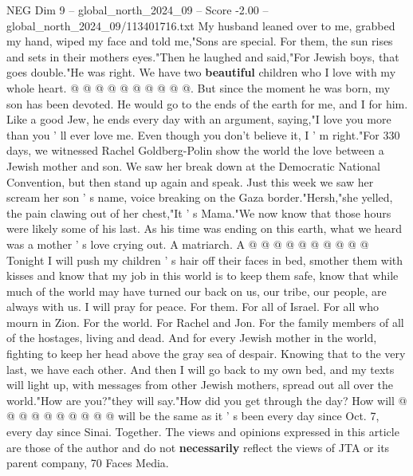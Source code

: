 \begin{textsample}{NEG Dim 9 – global\_north\_2024\_09 – Score -2.00 – global\_north\_2024\_09/113401716.txt}
My husband leaned over to me, grabbed my hand, wiped my face and told me,"Sons are special.
For them, the sun rises and sets in their mothers eyes."Then he laughed and said,"For Jewish boys, that goes double."He was right.
We have two \textbf{beautiful} children who I love with my whole heart. @ @ @ @ @ @ @ @ @ @.
But since the moment he was born, my son has been devoted.
He would go to the ends of the earth for me, and I for him.
Like a good Jew, he ends every day with an argument, saying,"I love you more than you ' ll ever love me.
Even though you don't believe it, I ' m right."For 330 days, we witnessed Rachel Goldberg-Polin show the world the love between a Jewish mother and son.
We saw her break down at the Democratic National Convention, but then stand up again and speak.
Just this week we saw her scream her son ' s name, voice breaking on the Gaza border."Hersh,"she yelled, the pain clawing out of her chest,"It ' s Mama."We now know that those hours were likely some of his last.
As his time was ending on this earth, what we heard was a mother ' s love crying out.
A matriarch.
A @ @ @ @ @ @ @ @ @ @ Tonight I will push my children ' s hair off their faces in bed, smother them with kisses and know that my job in this world is to keep them safe, know that while much of the world may have turned our back on us, our tribe, our people, are always with us.
I will pray for peace.
For them.
For all of Israel.
For all who mourn in Zion.
For the world.
For Rachel and Jon.
For the family members of all of the hostages, living and dead.
And for every Jewish mother in the world, fighting to keep her head above the gray sea of despair.
Knowing that to the very last, we have each other.
And then I will go back to my own bed, and my texts will light up, with messages from other Jewish mothers, spread out all over the world."How are you?"they will say."How did you get through the day?
How will @ @ @ @ @ @ @ @ @ @ will be the same as it ' s been every day since Oct. 7, every day since Sinai.
Together.
The views and opinions expressed in this article are those of the author and do not \textbf{necessarily} reflect the views of JTA or its parent company, 70 Faces Media.

\end{textsample}
